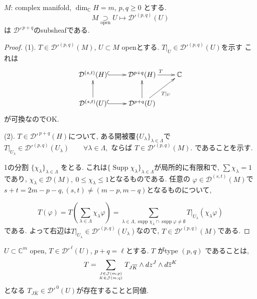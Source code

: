 \begin{tcolorbox}[mybox]
\begin{lem}
\label{lem-M-4.9}
\(M\): complex manifold, \(\dim_{\mathbb{C}}H=m\), \(p,q\geq 0\)
とする. 
\[
M \underset{\text{open}}{\supset} U \longmapsto \mathcal{D}'^{(p,q)}(U)
\]
は \(\mathcal{D}'^{\,p+q}\)のsubsheafである. 
\end{lem}
\end{tcolorbox}

\begin{proof}

(1). \(T\in \mathcal{D}'^{(p,q)}(M)\), \(U\subset M\) openとする. 
\(T|_U \in \mathcal{D}'^{(p,q)}(U)\)を示す
これは\[
\xymatrix{
\mathcal{D}^{(s,t)}(H) \ar@{^{(}->}[r] & \mathcal{D}^{p+q}(H) \ar[r]^{T} &   \mathbb{C}\\
\mathcal{D}^{(s,t)}(U) \ar@{^{(}->}[r] \ar[u] & \mathcal{D}^{p+q}(U) \ar[u] \ar[ur]_{T|_{U}} & 
}
\]
が可換なのでOK.

(2).
 \(T\in \mathcal{D}'^{\,p+q}(H)\)について, ある開被覆\( \{U_{\lambda}\}_{\lambda\in\Lambda}\)で
\(T|_{U_{\lambda}}\in \mathcal{D}'^{(p,q)}(U_{\lambda}) \qquad \forall \lambda\in\Lambda,
\)
ならば
\(
T\in \mathcal{D}'^{(p,q)}(M).
\)
であることを示す. 

1の分割
\(\{\chi_{\lambda}\}_{\lambda\in\Lambda}\) をとる. 
これは\(\{\operatorname{Supp}\chi_{\lambda}\}_{\lambda\in\Lambda}\)が局所的に有限和で, $ \sum \chi_{\lambda}=1$であり, 
\(
\chi_{\lambda}\in \mathcal{D}(M),\ 0\leq \chi_{\lambda}\leq 1
\)となるものである. 
任意の \(\varphi\in \mathcal{D}^{(s,t)}(M)\)で
\(
s+t=2m-p-q, (s,t)\neq (m-p,m-q)
\)となるものについて, 

\[
T(\varphi)=
T\left(\sum_{\lambda\in\Lambda}\chi_{\lambda}\varphi\right)
=\sum_{\lambda\in\Lambda, \operatorname{supp}\chi_{\lambda}\cap \operatorname{supp}\varphi \neq \emptyset}
T|_{U_{\lambda}}(\chi_{\lambda}\varphi)
\]
である. 
よって右辺は$T|_{U_{\lambda}}\in \mathcal{D}'^{(p,q)}(U_{\lambda})$なので, $T\in \mathcal{D}'^{(p,q)}(M)$である. 
\end{proof}





\begin{tcolorbox}[mybox]
\begin{lem}
\label{lem-M-4.10}
\(U\subset \mathbb{C}^{m}\) open, \(T\in \mathcal{D}'^{\,\ell}(U)\), \(p+q=\ell\)とする. 
\(T\) がtype \((p,q)\) であることは, 
\[
T=\sum_{J\in \mathcal{J}(m;p)\atop K\in \mathcal{J}(m;q)} T_{J\overline{K}}\wedge dz^{J}\wedge d\overline{z}^{K}
\]
となる \(T_{J\overline{K}}\in \mathcal{D}'^{\,0}(U)\)が存在することと同値. 
\end{lem}
\end{tcolorbox}

